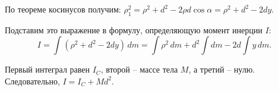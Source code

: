 По теореме косинусов получим: \( \rho_1^2 = \rho^2 + d^2 - 2\rho d\cos\alpha =
\rho^2 + d^2 - 2dy \).

Подставим это выражение в формулу, определяющую момент инерции \( I \):
\[
    I = \int (\rho^2 + d^2 - 2dy)\,dm = \int \rho^2\,dm + d^2\int dm -
    2d\int y\,dm.
\]

Первый интеграл равен \( I_C \), второй -- массе тела \( M \), а третий -- нулю.
Следовательно, \( I = I_C + Md^2 \).                                             


\newpage
